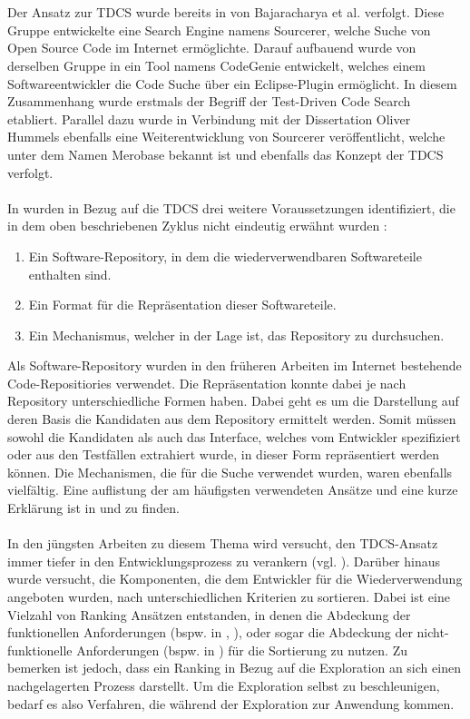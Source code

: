 \\\\
Der Ansatz zur TDCS wurde bereits in \cite{sourcerer} von Bajaracharya et al.  verfolgt. Diese Gruppe entwickelte eine Search Engine namens Sourcerer, welche Suche von Open Source Code im Internet ermöglichte. Darauf aufbauend wurde von derselben Gruppe in \cite{Lemos} ein Tool namens CodeGenie entwickelt, welches einem Softwareentwickler die Code Suche über ein Eclipse-Plugin ermöglicht. In diesem Zusammenhang wurde erstmals der Begriff der Test-Driven Code Search etabliert. Parallel dazu wurde in Verbindung mit der Dissertation Oliver Hummels \cite{hummel08} ebenfalls eine Weiterentwicklung von Sourcerer veröffentlicht, welche unter dem Namen Merobase bekannt ist und ebenfalls das Konzept der TDCS verfolgt.
\\\\
In \cite{hummel08} wurden in Bezug auf die TDCS drei weitere Voraussetzungen identifiziert, die in dem oben beschriebenen Zyklus nicht eindeutig erwähnt wurden :
\begin{enumerate}
\item Ein Software-Repository, in dem die wiederverwendbaren Softwareteile enthalten sind.
\item Ein Format für die Repräsentation dieser Softwareteile.
\item Ein Mechanismus, welcher in der Lage ist, das Repository zu durchsuchen.
\end{enumerate}
\noindent
Als Software-Repository wurden in den früheren Arbeiten im Internet bestehende Code-Repositiories verwendet. Die Repräsentation konnte dabei je nach Repository unterschiedliche Formen haben. Dabei geht es um die Darstellung auf deren Basis die Kandidaten aus dem Repository ermittelt werden. Somit müssen sowohl die Kandidaten als auch das Interface, welches vom Entwickler spezifiziert oder aus den Testfällen extrahiert wurde, in dieser Form repräsentiert werden können. Die Mechanismen, die für die Suche verwendet wurden, waren ebenfalls vielfältig. Eine auflistung der am häufigsten verwendeten Ansätze und eine kurze Erklärung ist in \cite{Hummel2013} und \cite{hummel08} zu finden.
\\\\
In den jüngsten Arbeiten zu diesem Thema wird versucht, den TDCS-Ansatz immer tiefer in den Entwicklungsprozess zu verankern (vgl. \cite{kessel2018}). Darüber hinaus wurde versucht, die Komponenten, die dem Entwickler für die Wiederverwendung angeboten wurden, nach unterschiedlichen Kriterien zu sortieren. Dabei ist eine Vielzahl von Ranking Ansätzen entstanden, in denen die Abdeckung der funktionellen Anforderungen (bspw. in \cite{STOLEE201635}, \cite{kessel2015}), oder sogar die Abdeckung der nicht-funktionelle Anforderungen (bspw. in \cite{kessel2016}) für die Sortierung zu nutzen. Zu bemerken ist jedoch, dass ein Ranking in Bezug auf die Exploration an sich einen nachgelagerten Prozess darstellt. Um die Exploration selbst zu beschleunigen, bedarf es also Verfahren, die während der Exploration zur Anwendung kommen.

